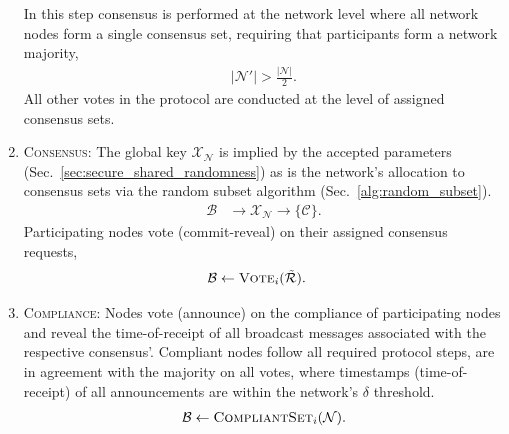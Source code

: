 \begin{enumerate}
	      In this step consensus is performed at the network level where all network nodes form a single consensus set, requiring that participants form a network majority,
	      \begin{align}
		      |\mathcal{N}'|>\frac{|\mathcal{N}|}{2}.
	      \end{align}
	      All other votes in the protocol are conducted at the level of assigned consensus sets.
	\item \textsc{Consensus}: The global key $\mathcal{X}_{\mathcal{N}}$ is implied by the accepted parameters (Sec.~\ref{sec:secure_shared_randomness}) as is the network's allocation to consensus sets via the random subset algorithm (Sec.~\ref{alg:random_subset}).
	      \begin{align}
		      \mathcal{B} & \to \mathcal{X}_{\mathcal{N}} \to \{\mathcal{C}\}.
	      \end{align}
	      Participating nodes vote (commit-reveal) on their assigned consensus requests,
	      \begin{align}
		      \mathcal{B} & \gets \textsc{Vote}_i(\tilde{\mathcal{R}}).
	      \end{align}
	\item \textsc{Compliance}: Nodes vote (announce) on the compliance of participating nodes and reveal the time-of-receipt of all broadcast messages associated with the respective consensus'. Compliant nodes follow all required protocol steps, are in agreement with the majority on all votes, where timestamps (time-of-receipt) of all announcements are within the network's $\delta$ threshold.
	      \begin{align}
		      \mathcal{B} \gets \textsc{CompliantSet}_i(\mathcal{N}).
	      \end{align}
\end{enumerate}



